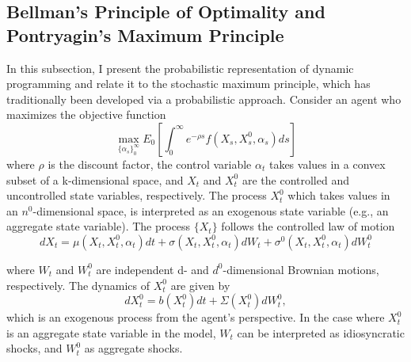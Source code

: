 \documentclass{article}
\begin{document}
\subsection{Bellman's Principle of Optimality and Pontryagin's Maximum Principle}
In this subsection, I present the probabilistic representation of dynamic programming and relate it to the stochastic maximum principle, which has traditionally been developed via a probabilistic approach. Consider an agent who maximizes the objective function
\[
\max_{\{\alpha_{s}\}_{0}^{\infty}}E_{0}\left[\int_{0}^{\infty}e^{-\rho s}f(X_{s},X_{s}^{0},\alpha_{s})ds\right]
\]
where $\rho$ is the discount factor, the control variable $\alpha_{t}$ takes values in a convex subset of a k-dimensional space, and $X_{t}$ and $X_{t}^{0}$ are the controlled and uncontrolled state variables, respectively. The process $X_{t}^{0}$ which takes values in an $n^{0}$-dimensional space, is interpreted as an exogenous state variable (e.g., an aggregate state variable). The process $\{X_{t}\}$ follows the controlled law of motion
\begin{equation}
dX_{t}=\mu(X_{t},X_{t}^{0},\alpha_{t})dt+\sigma(X_{t},X_{t}^{0},\alpha_{t})dW_{t}+\sigma^{0}(X_{t},X_{t}^{0},\alpha_{t})dW_{t}^{0}
\label{eq:27}
\end{equation}

\clearpage

where $W_{t}$ and $W_{t}^{0}$ are independent d- and $d^{0}$-dimensional Brownian motions, respectively. The dynamics of $X_{t}^{0}$ are given by
\[
dX_{t}^{0}=b(X_{t}^{0})dt+\Sigma(X_{t}^{0})dW_{t}^{0},
\]
which is an exogenous process from the agent's perspective. In the case where $X_{t}^{0}$ is an aggregate state variable in the model, $W_{t}$ can be interpreted as idiosyncratic shocks, and $W_{t}^{0}$ as aggregate shocks.
\end{document}
